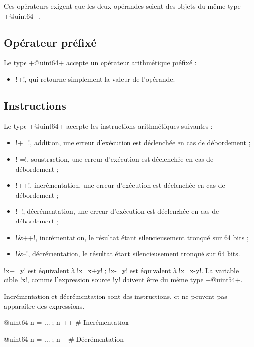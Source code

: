 Ces opérateurs exigent que les deux opérandes soient des objets du même type \ggs+@uint64+. 

\subsection{Opérateur préfixé}
Le type \ggs+@uint64+ accepte un opérateur arithmétique préfixé :
\begin{itemize}
  \item \ggs!+!, qui retourne simplement la valeur de l'opérande.
\end{itemize}

\subsection{Instructions}

Le type \ggs+@uint64+ accepte les instructions arithmétiques suivantes :
\begin{itemize}
  \item \ggs!+=!, addition, une erreur d'exécution est déclenchée en cas de débordement ;
  \item \ggs!-=!, soustraction, une erreur d'exécution est déclenchée en cas de débordement ;
  \item \ggs!++!, incrémentation, une erreur d'exécution est déclenchée en cas de débordement ;
  \item \ggs!--!, décrémentation, une erreur d'exécution est déclenchée en cas de débordement ;
  \item \ggs!&++!, incrémentation, le résultat étant silencieusement tronqué sur 64 bits ;
  \item \ggs!&--!, décrémentation, le résultat étant silencieusement tronqué sur 64 bits.
\end{itemize}

\ggs!x+=y! est équivalent à \ggs!x=x+y! ; \ggs!x-=y! est équivalent à \ggs!x=x-y!.
La variable cible \ggs!x!, comme l'expression source \ggs!y! doivent être du même type \ggs+@uint64+. 

Incrémentation et décrémentation sont des instructions, et ne peuvent pas apparaître des expressions.
\begin{galgas}
@uint64 n = ... ; n ++ # Incrémentation
\end{galgas}

\begin{galgas}
@uint64 n = ... ; n -- # Décrémentation
\end{galgas}


